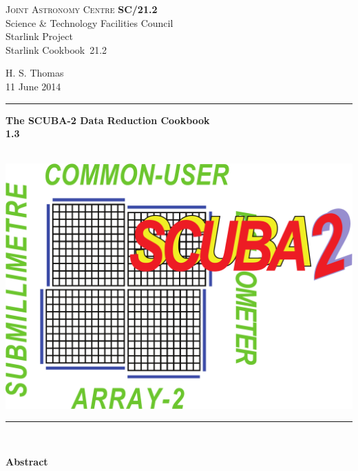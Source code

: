 \documentclass[twoside,11pt]{article}
\newcommand{\stardoccategory}  {Starlink Cookbook}
\newcommand{\stardocinitials}  {SC}
\newcommand{\stardocnumber}    {21.2}
\newcommand{\stardocauthors}   {H. S. Thomas}
\newcommand{\stardocdate}      {11 June 2014}
\newcommand{\stardoctitle}     {The SCUBA-2 Data Reduction Cookbook}
\newcommand{\stardocversion}   {1.3}
\newcommand{\stardocmanual}    {\ }
\newcommand{\stardocname}{\stardocinitials /\stardocnumber}
\newenvironment{latexonly}{}{}
\renewcommand{\_}{\texttt{\symbol{95}}}
\begin{document}
\thispagestyle{empty}

\begin{latexonly}
   \textsc{Joint Astronomy Centre} \hfill \textbf{\stardocname}\\
   {\large Science \& Technology Facilities Council}\\
   {\large Starlink Project\\}
   {\large \stardoccategory\ \stardocnumber}
   \begin{flushright}
   \stardocauthors\\
   \stardocdate
   \end{flushright}
   \vspace{-4mm}
   \rule{\textwidth}{0.5mm}
   \vspace{5mm}
   \begin{center}
   {\Huge\textbf{\stardoctitle \\ [2.5ex]}}
   {\LARGE\textbf{\stardocversion \\ [4ex]}}
   {\Huge\textbf{\stardocmanual}}
   \end{center}
   \vspace{5mm}

   \begin{center}
   \includegraphics[scale=0.4]{sc21_s2logo}
   \end{center}
   \vspace{5mm}
   \rule{\textwidth}{0.5mm}\\
   \vspace{15mm}

   \vspace{10mm}
   \begin{center}
      {\Large\textbf{Abstract}}
   \end{center}

\end{latexonly}
\end{document}
